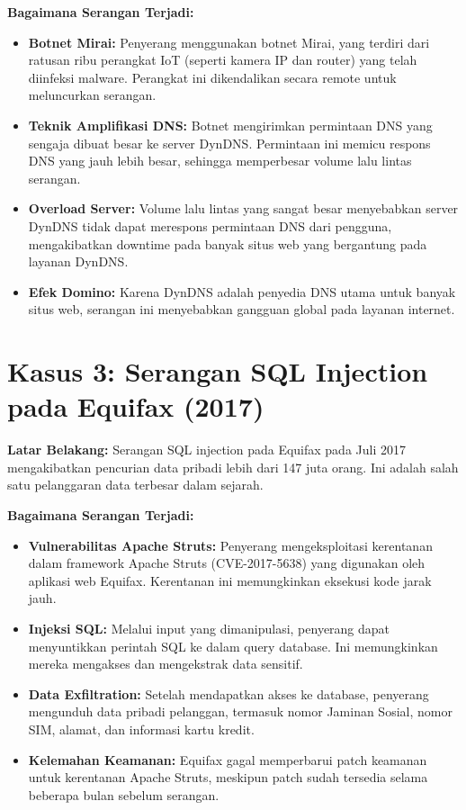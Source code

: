 \documentclass[12pt]{article}
\begin{document}
\textbf{Bagaimana Serangan Terjadi:}
\begin{itemize}
    \item \textbf{Botnet Mirai:} Penyerang menggunakan botnet Mirai, yang terdiri dari ratusan ribu perangkat IoT (seperti kamera IP dan router) yang telah diinfeksi malware. Perangkat ini dikendalikan secara remote untuk meluncurkan serangan.
    \item \textbf{Teknik Amplifikasi DNS:} Botnet mengirimkan permintaan DNS yang sengaja dibuat besar ke server DynDNS. Permintaan ini memicu respons DNS yang jauh lebih besar, sehingga memperbesar volume lalu lintas serangan.
    \item \textbf{Overload Server:} Volume lalu lintas yang sangat besar menyebabkan server DynDNS tidak dapat merespons permintaan DNS dari pengguna, mengakibatkan downtime pada banyak situs web yang bergantung pada layanan DynDNS.
    \item \textbf{Efek Domino:} Karena DynDNS adalah penyedia DNS utama untuk banyak situs web, serangan ini menyebabkan gangguan global pada layanan internet.
\end{itemize}

\section*{Kasus 3: Serangan SQL Injection pada Equifax (2017)}
\textbf{Latar Belakang:} 
Serangan SQL injection pada Equifax pada Juli 2017 mengakibatkan pencurian data pribadi lebih dari 147 juta orang. Ini adalah salah satu pelanggaran data terbesar dalam sejarah.

\textbf{Bagaimana Serangan Terjadi:}
\begin{itemize}
    \item \textbf{Vulnerabilitas Apache Struts:} Penyerang mengeksploitasi kerentanan dalam framework Apache Struts (CVE-2017-5638) yang digunakan oleh aplikasi web Equifax. Kerentanan ini memungkinkan eksekusi kode jarak jauh.
    \item \textbf{Injeksi SQL:} Melalui input yang dimanipulasi, penyerang dapat menyuntikkan perintah SQL ke dalam query database. Ini memungkinkan mereka mengakses dan mengekstrak data sensitif.
    \item \textbf{Data Exfiltration:} Setelah mendapatkan akses ke database, penyerang mengunduh data pribadi pelanggan, termasuk nomor Jaminan Sosial, nomor SIM, alamat, dan informasi kartu kredit.
    \item \textbf{Kelemahan Keamanan:} Equifax gagal memperbarui patch keamanan untuk kerentanan Apache Struts, meskipun patch sudah tersedia selama beberapa bulan sebelum serangan.
\end{itemize}
\end{document}
